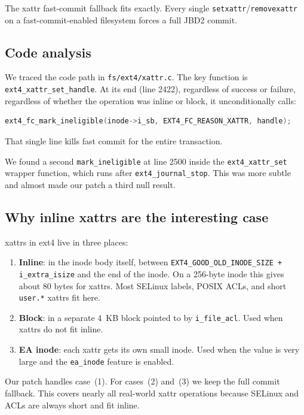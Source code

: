 \documentclass[11pt,a4paper]{article}
\begin{document}
The xattr fast-commit fallback fits exactly. Every single
\texttt{setxattr}/\texttt{removexattr} on a fast-commit-enabled
filesystem forces a full JBD2 commit.

\subsection{Code analysis}

We traced the code path in \texttt{fs/ext4/xattr.c}. The key
function is \texttt{ext4\_xattr\_set\_handle}. At its end (line
2422), regardless of success or failure, regardless of whether the
operation was inline or block, it unconditionally calls:

\begin{lstlisting}[language=C]
ext4_fc_mark_ineligible(inode->i_sb, EXT4_FC_REASON_XATTR, handle);
\end{lstlisting}

That single line kills fast commit for the entire transaction.

We found a second \texttt{mark\_ineligible} at line 2500 inside the
\texttt{ext4\_xattr\_set} wrapper function, which runs after
\texttt{ext4\_journal\_stop}. This was more subtle and almost made
our patch a third null result.

\subsection{Why inline xattrs are the interesting case}

xattrs in ext4 live in three places:
\begin{enumerate}[leftmargin=*]
  \item \textbf{Inline}: in the inode body itself, between
        \texttt{EXT4\_GOOD\_OLD\_INODE\_SIZE + i\_extra\_isize} and
        the end of the inode. On a 256-byte inode this gives about
        80 bytes for xattrs. Most SELinux labels, POSIX ACLs, and
        short \texttt{user.*} xattrs fit here.
  \item \textbf{Block}: in a separate 4~KB block pointed to by
        \texttt{i\_file\_acl}. Used when xattrs do not fit inline.
  \item \textbf{EA inode}: each xattr gets its own small inode.
        Used when the value is very large and the \texttt{ea\_inode}
        feature is enabled.
\end{enumerate}

Our patch handles case~(1). For cases~(2) and~(3) we keep the full
commit fallback. This covers nearly all real-world xattr operations
because SELinux and ACLs are always short and fit inline.
\end{document}
